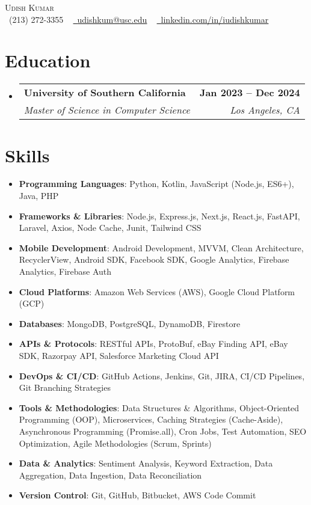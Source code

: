 \documentclass[letterpaper,10pt]{article}
\makeatletter
\newcommand{\resumeItem}[1]{
  \item\small{
    {#1 \vspace{-2pt}}
  }
}
\newcommand{\resumeSubheading}[4]{
  \vspace{-2pt}\item
    \begin{tabular*}{1.0\textwidth}[t]{l@{\extracolsep{\fill}}r}
      \textbf{#1} & \textbf{\small #2} \\
      \textit{\small#3} & \textit{\small #4} \\
    \end{tabular*}\vspace{-7pt}
}
\newcommand{\resumeSubHeadingListStart}{\begin{itemize}[leftmargin=0.15in, label={}]}
\newcommand{\resumeSubHeadingListEnd}{\end{itemize}}
\newcommand{\resumeItemListStart}{\begin{itemize}[leftmargin=*, itemsep=-1pt]}
\newcommand{\resumeItemListEnd}{\end{itemize}\vspace{-5pt}}
\makeatother
\begin{document}
\begin{center}
    {\Huge \scshape Udish Kumar} \\ \vspace{1pt}
    \small \raisebox{-0.1\height}\faPhone\ (213) 272-3355 ~ \href{mailto:udishkum@usc.edu}{\raisebox{-0.2\height}\faEnvelope\  \underline{udishkum@usc.edu}} ~ 
    \href{https://linkedin.com/in/iudishkumar/}{\raisebox{-0.2\height}\faLinkedin\ \underline{linkedin.com/in/iudishkumar}}
    \vspace{-8pt}
\end{center}
\vspace{-10pt}

\section{Education}
\resumeSubHeadingListStart
  \resumeSubheading
    {University of Southern California}{Jan 2023 -- Dec 2024}
    {Master of Science in Computer Science}{Los Angeles, CA}
\resumeSubHeadingListEnd
\vspace{-1pt}

\section{Skills}
\resumeItemListStart
  \resumeItem{\textbf{Programming Languages}: Python, Kotlin, JavaScript (Node.js, ES6+), Java, PHP}
  \resumeItem{\textbf{Frameworks \& Libraries}: Node.js, Express.js, Next.js, React.js, FastAPI, Laravel, Axios, Node Cache, Junit, Tailwind CSS}
  \resumeItem{\textbf{Mobile Development}: Android Development, MVVM, Clean Architecture, RecyclerView, Android SDK, Facebook SDK, Google Analytics, Firebase Analytics, Firebase Auth}
  \resumeItem{\textbf{Cloud Platforms}: Amazon Web Services (AWS), Google Cloud Platform (GCP)}
  \resumeItem{\textbf{Databases}: MongoDB, PostgreSQL, DynamoDB, Firestore}
  \resumeItem{\textbf{APIs \& Protocols}: RESTful APIs, ProtoBuf, eBay Finding API, eBay SDK, Razorpay API, Salesforce Marketing Cloud API}
  \resumeItem{\textbf{DevOps \& CI/CD}: GitHub Actions, Jenkins, Git, JIRA, CI/CD Pipelines, Git Branching Strategies}
  \resumeItem{\textbf{Tools \& Methodologies}: Data Structures \& Algorithms, Object-Oriented Programming (OOP), Microservices, Caching Strategies (Cache-Aside), Asynchronous Programming (Promise.all), Cron Jobs, Test Automation, SEO Optimization, Agile Methodologies (Scrum, Sprints)}
  \resumeItem{\textbf{Data \& Analytics}: Sentiment Analysis, Keyword Extraction, Data Aggregation, Data Ingestion, Data Reconciliation}
  \resumeItem{\textbf{Version Control}: Git, GitHub, Bitbucket, AWS Code Commit}
\resumeItemListEnd
\vspace{-1pt}
\end{document}
